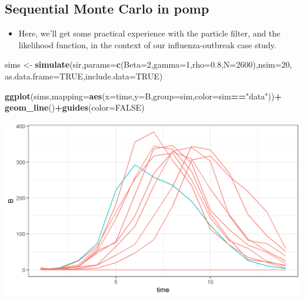 \documentclass[]{article}
\newenvironment{Shaded}{\begin{snugshade}}{\end{snugshade}}
\newcommand{\KeywordTok}[1]{\textcolor[rgb]{0.13,0.29,0.53}{\textbf{#1}}}
\newcommand{\DataTypeTok}[1]{\textcolor[rgb]{0.13,0.29,0.53}{#1}}
\newcommand{\DecValTok}[1]{\textcolor[rgb]{0.00,0.00,0.81}{#1}}
\newcommand{\FloatTok}[1]{\textcolor[rgb]{0.00,0.00,0.81}{#1}}
\newcommand{\StringTok}[1]{\textcolor[rgb]{0.31,0.60,0.02}{#1}}
\newcommand{\OtherTok}[1]{\textcolor[rgb]{0.56,0.35,0.01}{#1}}
\newcommand{\OperatorTok}[1]{\textcolor[rgb]{0.81,0.36,0.00}{\textbf{#1}}}
\newcommand{\NormalTok}[1]{#1}
\providecommand{\tightlist}{%
  \setlength{\itemsep}{0pt}\setlength{\parskip}{0pt}}
\begin{document}
\subsection{\texorpdfstring{Sequential Monte Carlo in
\textbf{pomp}}{Sequential Monte Carlo in pomp}}\label{sequential-monte-carlo-in-pomp}

\begin{itemize}
\tightlist
\item
  Here, we'll get some practical experience with the particle filter,
  and the likelihood function, in the context of our influenza-outbreak
  case study.
\end{itemize}

\begin{Shaded}
\begin{Highlighting}[]
\NormalTok{sims <-}\StringTok{ }\KeywordTok{simulate}\NormalTok{(sir,}\DataTypeTok{params=}\KeywordTok{c}\NormalTok{(}\DataTypeTok{Beta=}\DecValTok{2}\NormalTok{,}\DataTypeTok{gamma=}\DecValTok{1}\NormalTok{,}\DataTypeTok{rho=}\FloatTok{0.8}\NormalTok{,}\DataTypeTok{N=}\DecValTok{2600}\NormalTok{),}\DataTypeTok{nsim=}\DecValTok{20}\NormalTok{,}
                 \DataTypeTok{as.data.frame=}\OtherTok{TRUE}\NormalTok{,}\DataTypeTok{include.data=}\OtherTok{TRUE}\NormalTok{)}

\KeywordTok{ggplot}\NormalTok{(sims,}\DataTypeTok{mapping=}\KeywordTok{aes}\NormalTok{(}\DataTypeTok{x=}\NormalTok{time,}\DataTypeTok{y=}\NormalTok{B,}\DataTypeTok{group=}\NormalTok{sim,}\DataTypeTok{color=}\NormalTok{sim}\OperatorTok{==}\StringTok{"data"}\NormalTok{))}\OperatorTok{+}
\StringTok{  }\KeywordTok{geom_line}\NormalTok{()}\OperatorTok{+}\KeywordTok{guides}\NormalTok{(}\DataTypeTok{color=}\OtherTok{FALSE}\NormalTok{)}
\end{Highlighting}
\end{Shaded}

\begin{center}\includegraphics{figure/notes12-sir-sim1-1} \end{center}
\end{document}
